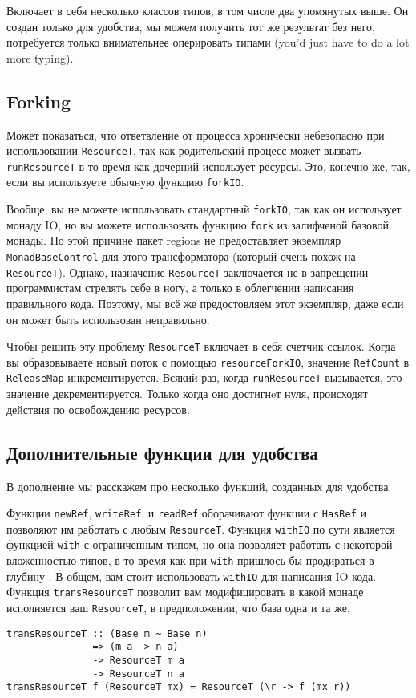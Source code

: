 Включает в себя несколько классов типов, в том числе два
упомянутых выше. Он создан только для удобства, мы можем получить тот же результат без
него, потребуется только внимательнее оперировать типами (you'd just have to do a lot
more typing).
   
\subsection{Forking}

Может показаться, что ответвление от процесса хронически небезопасно при использовании 
\lstinline'ResourceT', так как родительский процесс может вызвать
\lstinline'runResourceT' в то время
как дочерний использует ресурсы. Это, конечно же, так, если вы используете обычную
функцию \lstinline'forkIO'.
\begin{remark}
Вообще, вы не можете использовать стандартный \lstinline'forkIO', так как он
использует монаду
IO, но вы можете использовать функцию \lstinline'fork' из залифченой базовой монады.
По этой причине пакет regions не предоставляет экземпляр \lstinline'MonadBaseControl' для
этого
трансформатора (который очень похож на \lstinline'ResourceT'). Однако, назначение
\lstinline'ResourceT' заключается не в запрещении 
программистам стрелять себе в ногу, а только в облегчении написания
правильного кода. Поэтому, мы всё же предостовляем этот экземпляр, даже если он может быть
использован неправильно. 
\end{remark}
Чтобы решить эту проблему \lstinline'ResourceT' включает в себя
счетчик ссылок. Когда вы образовываете новый поток с помощью \lstinline'resourceForkIO',
значение \lstinline'RefCount' в \lstinline'ReleaseMap' инкрементируется. Всякий раз, когда
\lstinline'runResourceT'
вызывается, это значение декрементируется. Только когда оно достигнeт нуля, происходят
действия по освобождению ресурсов.
 
\subsection{Дополнительные функции для удобства}

В дополнение мы расскажем про несколько функций, созданных для удобства.
   
Функции \verb=newRef=, \verb=writeRef=, и \verb=readRef= оборачивают
функции с \lstinline'HasRef' и позволяют им работать с любым \lstinline'ResourceT'.
Функция \verb=withIO= по сути является функцией \verb=with= с ограниченным типом, но она 
позволяет работать с некоторой вложенностью типов, в то время как при \verb=with=
пришлось бы продираться в глубину . В общем, вам стоит
использовать \lstinline'withIO' для написания IO кода.
Функция \verb=transResourceT= позволит вам модифицировать в какой монаде исполняется ваш
\verb=ResourceT=, в предположении, что база одна и та же.
\begin{lstlisting}
transResourceT :: (Base m ~ Base n)
               => (m a -> n a)
               -> ResourceT m a
               -> ResourceT n a
transResourceT f (ResourceT mx) = ResourceT (\r -> f (mx r))
\end{lstlisting}  

